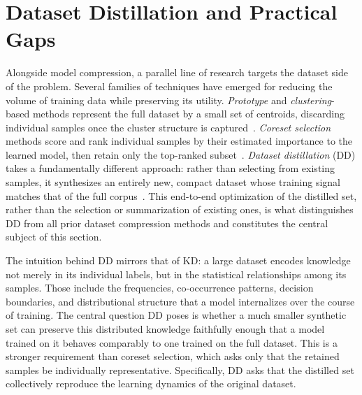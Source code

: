 \section{Dataset Distillation and Practical Gaps} \label{sec:13-introduction-dataset}
\begin{foldable}
  Alongside model compression, a parallel line of research targets the dataset side of the problem.
  Several families of techniques have emerged for reducing the volume of training data while preserving its utility.
  \textit{Prototype} and \textit{clustering}-based methods represent the full dataset by a small set of centroids, discarding individual samples once the cluster structure is captured~\cite{macqueen1967some,dempster1977maximum}.
  \textit{Coreset selection} methods score and rank individual samples by their estimated importance to the learned model, then retain only the top-ranked subset~\cite{sener2018active}.
  \textit{Dataset distillation} (\ac{DD}) takes a fundamentally different approach: rather than selecting from existing samples, it synthesizes an entirely new, compact dataset whose training signal matches that of the full corpus~\cite{wang2018dataset}.
  This end-to-end optimization of the distilled set, rather than the selection or summarization of existing ones, is what distinguishes \ac{DD} from all prior dataset compression methods and constitutes the central subject of this section.
\end{foldable}

\begin{foldable}
  The intuition behind \ac{DD} mirrors that of \ac{KD}: a large dataset encodes knowledge not merely in its individual labels, but in the statistical relationships among its samples.
  Those include the frequencies, co-occurrence patterns, decision boundaries, and distributional structure that a model internalizes over the course of training.
  The central question \ac{DD} poses is whether a much smaller synthetic set can preserve this distributed knowledge faithfully enough that a model trained on it behaves comparably to one trained on the full dataset.
  This is a stronger requirement than coreset selection, which asks only that the retained samples be individually representative.
  Specifically, \ac{DD} asks that the distilled set collectively reproduce the learning dynamics of the original dataset.
\end{foldable}

